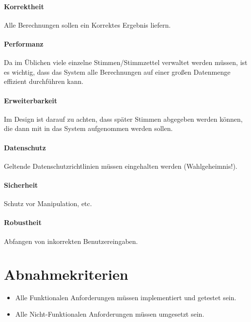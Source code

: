 \documentclass[11pt,a4paper]{scrartcl}
\begin{document}
\paragraph{Korrektheit}
Alle Berechnungen sollen ein Korrektes Ergebnis liefern.
\paragraph{Performanz}
Da im Üblichen viele einzelne Stimmen/Stimmzettel verwaltet werden müssen, ist es wichtig, dass das System alle Berechnungen auf einer großen Datenmenge effizient durchführen kann.
\paragraph{Erweiterbarkeit}
Im Design ist darauf zu achten, dass später Stimmen abgegeben werden können, die dann mit in das System aufgenommen werden sollen.
\paragraph{Datenschutz}
Geltende Datenschutzrichtlinien müssen eingehalten werden (Wahlgeheimnis!).
\paragraph{Sicherheit}
Schutz vor Manipulation, etc.
\paragraph{Robustheit}
Abfangen von inkorrekten Benutzereingaben.
\section{Abnahmekriterien}
\begin{itemize}
\item Alle Funktionalen Anforderungen müssen implementiert und getestet sein.
\item Alle Nicht-Funktionalen Anforderungen müssen umgesetzt sein.
\end{itemize}
\end{document}
